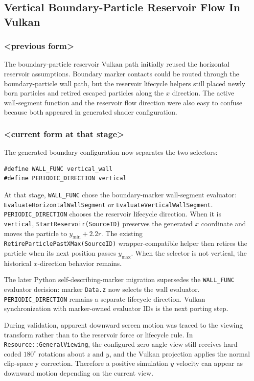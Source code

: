 \subsection{Vertical Boundary-Particle Reservoir Flow In Vulkan}

\subsubsection{<previous form>}

The boundary-particle reservoir Vulkan path initially reused the horizontal
reservoir assumptions.  Boundary marker contacts could be routed through the
boundary-particle wall path, but the reservoir lifecycle helpers still placed
newly born particles and retired escaped particles along the \(x\) direction.
The active wall-segment function and the reservoir flow direction were also
easy to confuse because both appeared in generated shader configuration.

\subsubsection{<current form at that stage>}

The generated boundary configuration now separates the two selectors:

\begin{verbatim}
#define WALL_FUNC vertical_wall
#define PERIODIC_DIRECTION vertical
\end{verbatim}

At that stage, \texttt{WALL\_FUNC} chose the boundary-marker wall-segment evaluator:
\texttt{EvaluateHorizontalWallSegment} or
\texttt{EvaluateVerticalWallSegment}.  \texttt{PERIODIC\_DIRECTION} chooses
the reservoir lifecycle direction.  When it is \texttt{vertical},
\texttt{StartReservoir(SourceID)} preserves the generated \(x\) coordinate
and moves the particle to \(y_{\min}+2.2r\).  The existing
\texttt{RetireParticlePastXMax(SourceID)} wrapper-compatible helper then
retires the particle when its next position passes \(y_{\max}\).  When the
selector is not vertical, the historical \(x\)-direction behavior remains.

The later Python self-describing-marker migration supersedes the
\texttt{WALL\_FUNC} evaluator decision: marker \texttt{Data.z} now selects the
wall evaluator.  \texttt{PERIODIC\_DIRECTION} remains a separate lifecycle
direction.  Vulkan synchronization with marker-owned evaluator IDs is the next
porting step.

During validation, apparent downward screen motion was traced to the viewing
transform rather than to the reservoir force or lifecycle rule.  In
\texttt{Resource::GeneralViewing}, the configured zero-angle view still
receives hard-coded \(180^\circ\) rotations about \(z\) and \(y\), and the
Vulkan projection applies the normal clip-space y correction.  Therefore a
positive simulation \(y\) velocity can appear as downward motion depending on
the current view.

